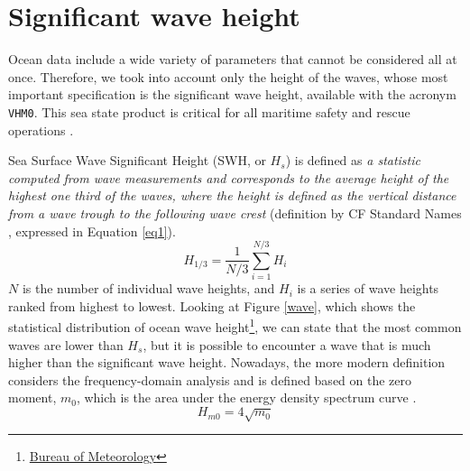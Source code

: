 \section{Significant wave height}
Ocean data include a wide variety of parameters that cannot be considered all at once. Therefore, we took into account only the height of the waves, whose most important specification is the significant wave height, available with the acronym \texttt{VHM0}. This sea state product is critical for all maritime safety and rescue operations \cite{esa}.

Sea Surface Wave Significant Height (SWH, or $H_s$) is defined as \textit{a statistic computed from wave measurements and corresponds to the average height of the highest one third of the waves, where the height is defined as the vertical distance from a wave trough to the following wave crest} (definition by CF Standard Names \cite{cmip6}, expressed in Equation \ref{eq1}).
\begin{equation}\label{eq1}
	H_{1/3}=\frac{1}{N/3}\sum_{i=1}^{N/3}H_i
\end{equation}
$N$ is the number of individual wave heights, and $H_i$ is a series of wave heights ranked from highest to lowest. Looking at Figure \ref{wave}, which shows the statistical distribution of ocean wave height\footnote{\href{https://media.bom.gov.au/social/blog/870/ruling-the-waves-how-a-simple-wave-height-concept-can-help-you-judge-the-size-of-the-sea/}{Bureau of Meteorology}}, we can state that the most common waves are lower than $H_s$, but it is possible to encounter a wave that is much higher than the significant wave height.
Nowadays, the more modern definition considers the frequency-domain analysis and is defined based on the zero moment, $m_0$, which is the area under the energy density spectrum curve \cite{BAI201673}.
\begin{equation}\label{eq2}
	H_{m0}=4\sqrt{m_0}
\end{equation}
